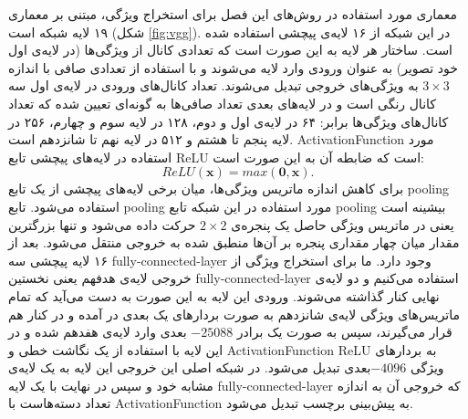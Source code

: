 معماری مورد استفاده در روش‌های این فصل برای استخراج ویژگی، مبتنی بر معماری ۱۹ لایه شبکه  \cite{vgg} است (شکل \ref{fig:vgg}). در این شبکه از ۱۶ لایه‌ی پیچشی استفاده شده است. ساختار هر لایه به این صورت است که تعدادی کانال از ویژگی‌ها (در لایه‌ی اول  خود تصویر) به عنوان ورودی وارد لایه می‌شوند و با استفاده از تعدادی صافی با اندازه $3 \times 3$ به ویژگی‌های خروجی تبدیل می‌شوند. تعداد کانال‌های ورودی در لایه‌ی اول سه کانال رنگی  است و در لایه‌های بعدی تعداد صافی‌ها به گونه‌ای تعیین شده که تعداد کانال‌های ویژگی‌ها برابر: ۶۴ در لایه‌ی اول و دوم، ۱۲۸ در لایه‌ سوم و چهارم، ۲۵۶ در لایه پنجم تا هشتم و ۵۱۲ در لایه نهم تا شانزدهم است. \gls{ActivationFunction} مورد استفاده در لایه‌های پیچشی تابع \gls{ReLU} است که ضابطه آن به این صورت است:
\begin{equation}
ReLU(\mathbf{x}) = max(\mathbf{0,x}).
\end{equation}
 برای کاهش اندازه ماتریس ویژگی‌ها، میان برخی لایه‌های پیچشی از یک تابع \gls{pooling} استفاده می‌شود. تابع \gls{pooling} مورد استفاده در این شبکه تابع \gls{pooling} بیشینه است یعنی در ماتریس ویژگی‌ حاصل یک پنجره‌ی $2 \times 2$ حرکت داده می‌شود و تنها بزرگترین مقدار میان چهار مقداری پنجره بر آن‌ها منطبق شده به خروجی منتقل می‌شود. بعد از ۱۶ لایه پیچشی سه \gls{fully-connected-layer} وجود دارد. ما برای استخراج ویژگی از خروجی لایه‌ی هدفهم یعنی نخستین  \gls{fully-connected-layer} استفاده می‌کنیم و دو لایه‌ی نهایی کنار گذاشته می‌شوند. ورودی این لایه به این صورت به دست می‌آید که تمام ماتریس‌های ویژگی لایه‌ی شانزدهم به صورت بردارهای یک بعدی در آمده و در کنار هم قرار می‌گیرند، سپس به صورت یک برادر $-25088$ بعدی وارد لایه‌ی هفدهم شده و در این لایه با استفاده از یک نگاشت خطی و \gls{ActivationFunction}   \gls{ReLU} به بردارهای ویژگی $-4096$بعدی تبدیل می‌شود. در شبکه اصلی این خروجی این لایه به یک لایه‌ی مشابه خود و سپس در نهایت با یک لایه \gls{fully-connected-layer} که خروجی آن به اندازه تعداد دسته‌هاست با  \gls{ActivationFunction}
 به پیش‌بینی برچسب تبدیل می‌شود.

